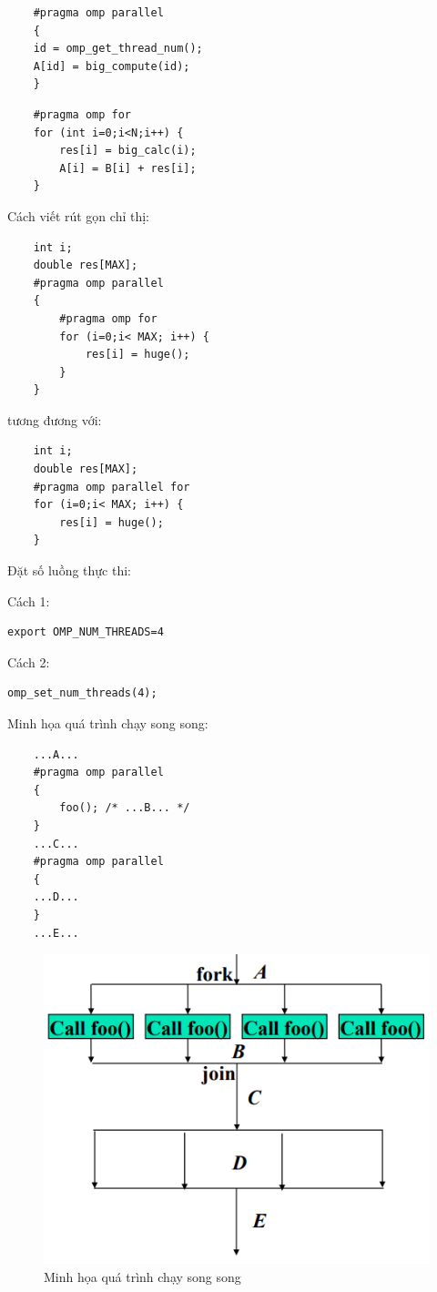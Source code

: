 \documentclass[14pt, a4paper]{article}
\numberwithin{equation}{section}
\numberwithin{figure}{section}
\numberwithin{dl}{section}
\numberwithin{md}{section}
\numberwithin{bd}{section}
\numberwithin{dn}{section}
\numberwithin{hq}{section}
\begin{document}
\begin{verbatim}
    #pragma omp parallel
    {
    id = omp_get_thread_num(); 
    A[id] = big_compute(id);
    }		
\end{verbatim}

\begin{verbatim}
    #pragma omp for
    for (int i=0;i<N;i++) {
        res[i] = big_calc(i);
        A[i] = B[i] + res[i]; 
    }
\end{verbatim}

Cách viết rút gọn chỉ thị:

\begin{verbatim}
    int i;
    double res[MAX];
    #pragma omp parallel				
    {
        #pragma omp for
        for (i=0;i< MAX; i++) {
            res[i] = huge();
        } 
    }
\end{verbatim}

tương đương với:

\begin{verbatim}
    int i;
    double res[MAX];
    #pragma omp parallel for					
    for (i=0;i< MAX; i++) {
        res[i] = huge();
    }
\end{verbatim}

Đặt số luồng thực thi:

Cách 1:
\begin{verbatim}
export OMP_NUM_THREADS=4
\end{verbatim}
    Cách 2:
    \begin{verbatim}
omp_set_num_threads(4);
    \end{verbatim}

Minh họa quá trình chạy song song:

\begin{verbatim}
    ...A... 
    #pragma omp parallel
    {
        foo(); /* ...B... */
    }
    ...C... 
    #pragma omp parallel
    {
    ...D...
    }
    ...E...
\end{verbatim}

\begin{figure}[H]
    \centering
    \includegraphics[width=0.7\linewidth]{figures/OpenMP/Fork.png}
    \caption{Minh họa quá trình chạy song song}
\end{figure}
\end{document}
